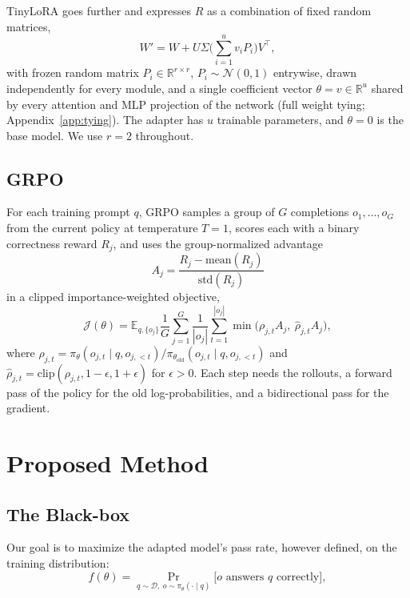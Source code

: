 \documentclass[twoside]{article}
\newcommand{\mcN}{\mathcal{N}}
\newcommand{\mcD}{\mathcal{D}}
\newcommand{\mbR}{\mathbb{R}}
\newcommand{\mbE}{\mathbb{E}}
\begin{document}
TinyLoRA \citep{morris2026learning} goes further and expresses $R$ as a combination of fixed random matrices,
\begin{equation}
    W' = W + U \Sigma \Big( \sum_{i=1}^{u} v_i P_i \Big) V^\top,
    \label{eq:tinylora}
\end{equation}
with frozen random matrix $P_i \in \mbR^{r \times r}$, $P_i \sim \mcN(0, 1)$ entrywise, drawn independently for every module, and a single coefficient vector $\theta = v \in \mbR^u$ shared by every attention and MLP projection of the network (full weight tying; Appendix~\ref{app:tying}). The adapter has $u$ trainable parameters, and $\theta = 0$ is the base model. We use $r = 2$ throughout.

\subsection{GRPO}
For each training prompt $q$, GRPO samples a group of $G$ completions $o_1, \dots, o_G$ from the current policy at temperature $T = 1$, scores each with a binary correctness reward $R_j$, and uses the group-normalized advantage %
\begin{equation}
    A_j = \frac{R_j - \mathrm{mean}(R_j)}{\mathrm{std}(R_j)}
    \label{eq:advantage}
\end{equation}
in a clipped importance-weighted objective,
\begin{equation*}
    \mathcal{J}(\theta) = \mbE_{q, \{o_j\}} \frac{1}{G} \sum_{j=1}^{G} \frac{1}{|o_j|} \sum_{t=1}^{|o_j|} \min\!\big( \rho_{j,t} A_j,\ \hat\rho_{j,t} A_j \big),
\end{equation*}
where $\rho_{j,t} = \pi_\theta(o_{j,t} \mid q, o_{j,<t}) / \pi_{\theta_\mathrm{old}}(o_{j,t} \mid q, o_{j,<t})$ and $\hat\rho_{j,t} = \mathrm{clip}(\rho_{j,t}, 1 - \epsilon, 1 + \epsilon)$ for $\epsilon>0$.
Each step needs the rollouts, a forward pass of the policy for the old log-probabilities, and a bidirectional pass for the gradient.
\section{Proposed Method}
\label{sec:method}

\subsection{The Black-box}

Our goal is to maximize the adapted model's pass rate, however defined, on the training distribution:
\begin{equation}
    f(\theta) = \Pr_{q \sim \mcD,\ o \sim \pi_\theta(\cdot \mid q)}\big[ o \text{ answers } q \text{ correctly} \big],
\end{equation}
\end{document}
